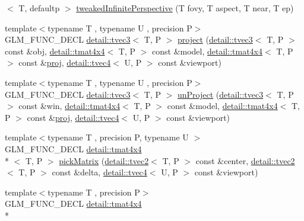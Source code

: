 \begin{DoxyCompactItemize}
$<$ T, defaultp $>$ \hyperlink{group__gtc__matrix__transform_gade8abc58c0ac541163e872eb66f3e5de}{tweaked\-Infinite\-Perspective} (T fovy, T aspect, T near, T ep)
\item 
{\footnotesize template$<$typename T , typename U , precision P$>$ }\\G\-L\-M\-\_\-\-F\-U\-N\-C\-\_\-\-D\-E\-C\-L \hyperlink{structglm_1_1detail_1_1tvec3}{detail\-::tvec3}$<$ T, P $>$ \hyperlink{group__gtc__matrix__transform_ga41227b7b98882dcbaa8dab52df372c7b}{project} (\hyperlink{structglm_1_1detail_1_1tvec3}{detail\-::tvec3}$<$ T, P $>$ const \&obj, \hyperlink{structglm_1_1detail_1_1tmat4x4}{detail\-::tmat4x4}$<$ T, P $>$ const \&model, \hyperlink{structglm_1_1detail_1_1tmat4x4}{detail\-::tmat4x4}$<$ T, P $>$ const \&\hyperlink{group__gtx__projection_gadf29123bcf748fc9d6fb0998192184cf}{proj}, \hyperlink{structglm_1_1detail_1_1tvec4}{detail\-::tvec4}$<$ U, P $>$ const \&viewport)
\item 
{\footnotesize template$<$typename T , typename U , precision P$>$ }\\G\-L\-M\-\_\-\-F\-U\-N\-C\-\_\-\-D\-E\-C\-L \hyperlink{structglm_1_1detail_1_1tvec3}{detail\-::tvec3}$<$ T, P $>$ \hyperlink{group__gtc__matrix__transform_ga4b0a9086d15e2a743ecd7b6128146af1}{un\-Project} (\hyperlink{structglm_1_1detail_1_1tvec3}{detail\-::tvec3}$<$ T, P $>$ const \&win, \hyperlink{structglm_1_1detail_1_1tmat4x4}{detail\-::tmat4x4}$<$ T, P $>$ const \&model, \hyperlink{structglm_1_1detail_1_1tmat4x4}{detail\-::tmat4x4}$<$ T, P $>$ const \&\hyperlink{group__gtx__projection_gadf29123bcf748fc9d6fb0998192184cf}{proj}, \hyperlink{structglm_1_1detail_1_1tvec4}{detail\-::tvec4}$<$ U, P $>$ const \&viewport)
\item 
{\footnotesize template$<$typename T , precision P, typename U $>$ }\\G\-L\-M\-\_\-\-F\-U\-N\-C\-\_\-\-D\-E\-C\-L \hyperlink{structglm_1_1detail_1_1tmat4x4}{detail\-::tmat4x4}\\*
$<$ T, P $>$ \hyperlink{group__gtc__matrix__transform_ga0fb64f04bf5ad52523fcd4b10b46aff6}{pick\-Matrix} (\hyperlink{structglm_1_1detail_1_1tvec2}{detail\-::tvec2}$<$ T, P $>$ const \&center, \hyperlink{structglm_1_1detail_1_1tvec2}{detail\-::tvec2}$<$ T, P $>$ const \&delta, \hyperlink{structglm_1_1detail_1_1tvec4}{detail\-::tvec4}$<$ U, P $>$ const \&viewport)
\item 
{\footnotesize template$<$typename T , precision P$>$ }\\G\-L\-M\-\_\-\-F\-U\-N\-C\-\_\-\-D\-E\-C\-L \hyperlink{structglm_1_1detail_1_1tmat4x4}{detail\-::tmat4x4}\\*

\end{DoxyCompactItemize}
